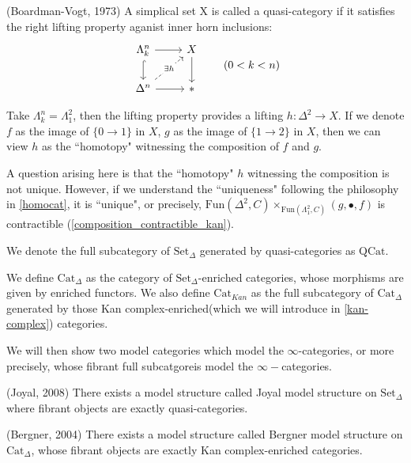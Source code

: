 \begin{definition}(Boardman-Vogt, 1973)
    A simplical set X is called a quasi-category if it satisfies the right lifting property aganist inner horn inclusions:
\[
\begin{tikzcd}
\Lambda^n_k \arrow[r] \arrow[d, hook] & X \arrow[d] \\
\Delta^n \arrow[r] \arrow[ur, dashed, "\exists h" description] & \ast
\end{tikzcd}
\qquad (0 < k < n)
\] 
\end{definition}

Take $\Lambda^n_k= \Lambda^2_1$, then the lifting property provides a lifting $h:\Delta^2\to X$. If we denote $f$ as the image of $\{0\to1\}$ in $X$, $g$ as the image of $\{1\to2\}$ in $X$, then we can view $h$ as the ``homotopy" witnessing the composition of $f$ and $g$.

A question arising here is that the ``homotopy" $h$ witnessing the composition is not unique. However, if we understand the ``uniqueness" following the philosophy in \ref{homocat}, it is ``unique", or precisely, $\text{Fun}(\Delta^2,C)\times_{\text{Fun}(\Lambda^2_1,C)}(g,\bullet,f)$ is contractible (\ref{composition_contractible_kan}).



\begin{remark}
    We denote the full subcategory of $\text{Set}_\Delta$ generated by quasi-categories as $\text{QCat}$.
\end{remark}


\begin{definition}
    We define $\text{Cat}_{\Delta}$ as the category of $\text{Set}_{\Delta}$-enriched categories, whose morphisms are given by enriched functors. We also define $\text{Cat}_{Kan}$ as the full subcategory of $\text{Cat}_{\Delta}$ generated by those Kan complex-enriched(which we will introduce in \ref{kan-complex}) categories.
\end{definition}


We will then show two model categories which model the $\infty$-categories, or more precisely, whose fibrant full subcatgoreis model the $\infty-$categories.


\begin{theorem}(Joyal, 2008)
    There exists a model structure called Joyal model structure on $\text{Set}_\Delta$ where fibrant objects are exactly quasi-categories.
\end{theorem}

\begin{theorem}(Bergner, 2004)
    There exists a model structure called Bergner model structure on $\text{Cat}_\Delta$, whose fibrant objects are exactly Kan complex-enriched categories.
    
\end{theorem}

